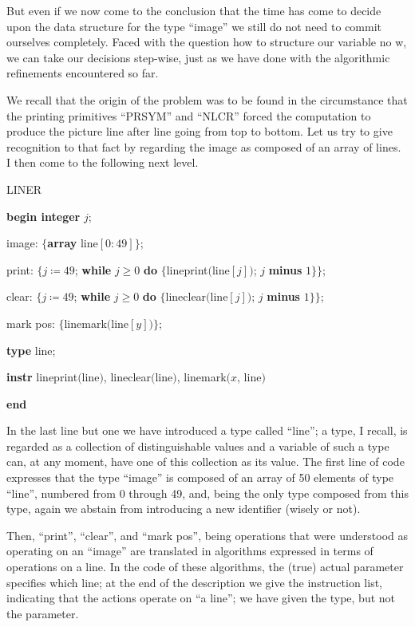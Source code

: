 But even if we now come to the conclusion that the time has come to decide upon the data structure for the type ``image'' we still do not need to commit ourselves completely. Faced with the question how to structure our variable no w, we can take our decisions step-wise, just as we have done with the algorithmic refinements encountered so far.

We recall that the origin of the problem was to be found in the circumstance that the printing primitives ``PRSYM'' and ``NLCR'' forced the computation to produce the picture line after line going from top to bottom. Let us try to give recognition to that fact by regarding the image as composed of an array of lines. I then come to the following next level.

LINER

\textbf{begin integer} $j$;

\quad image: $\{$\textbf{array} line$[0: 49]\}$;

\quad print: $\{j \coloneq 49$; \textbf{while} $j \geqslant 0$ \textbf{do} $\{$lineprint$($line$[j])$; $j$ \textbf{minus} $1\}\}$;

\quad clear: $\{j \coloneq 49$; \textbf{while} $j \geqslant 0$ \textbf{do} $\{$lineclear$($line$[j])$; $j$ \textbf{minus} $1\}\}$;

\quad mark pos: $\{$linemark$($line$[y])\}$;

\quad \textbf{type} line;

\quad \textbf{instr} lineprint$($line$)$, lineclear$($line$)$, linemark$(x$, line$)$

\textbf{end}

In the last line but one we have introduced a type called ``line''; a type, I recall, is regarded as a collection of distinguishable values and a variable of such a type can, at any moment, have one of this collection as its value. The first line of code expresses that the type ``image'' is composed of an array of 50 elements of type ``line'', numbered from 0 through 49, and, being the only type composed from this type, again we abstain from introducing a new identifier (wisely or not).

Then, ``print'', ``clear'', and ``mark pos'', being operations that were understood as operating on an ``image'' are translated in algorithms expressed in terms of operations on a line. In the code of these algorithms, the (true) actual parameter specifies which line; at the end of the description we give the instruction list, indicating that the actions operate on ``a line''; we have given the type, but not the parameter.

